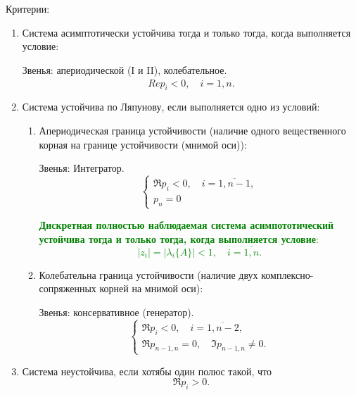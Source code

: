 Критерии:
\begin{enumerate}
    \item Система асимптотически устойчива тогда и только тогда, когда выполняется условие:
    
    Звенья: апериодической (I и II), колебательное.
    \begin{equation}
        Re p_i < 0, \quad i = \overline{1,n}.
    \end{equation}
    
    \item Система устойчива по Ляпунову, если выполняется одно из условий:
        \begin{enumerate}
            \item Апериодическая граница устойчивости (наличие одного вещественного корная на границе устойчивости (мнимой оси)): 
    
            Звенья: Интегратор.
            \begin{equation}
                \begin{cases}
                    \Re p_i < 0, \quad i = \overline{1, n-1}, \\
                    p_n = 0
                \end{cases}
            \end{equation}
            
            \textcolor{green}{
                \textbf{Дискретная полностью наблюдаемая система асимпототический устойчива тогда и только тогда, когда выполняется условие}:
                \begin{equation}
                    |z_i| = |\lambda_i\{A\}| < 1, \quad i = \overline{1,n}.
                \end{equation}
            }
    
            \item Колебательна граница устойчивости (наличие двух комплексно-сопряженных корней на мнимой оси):
            
            Звенья: консервативное (генератор).
            \begin{equation}
                \begin{cases}
                    \Re p_i < 0, \quad i = \overline{1, n-2}, \\
                    \Re p_{n-1, n} = 0, \quad \Im p_{n-1, n} \ne 0.
                \end{cases}
            \end{equation}
        \end{enumerate}
        
    \item Система неустойчива, если хотябы один полюс такой, что
    \begin{equation}
        \Re p_i > 0.
    \end{equation}
\end{enumerate}